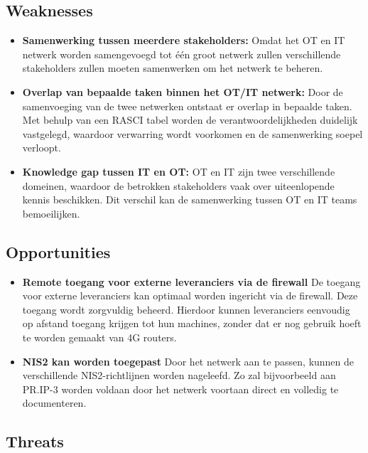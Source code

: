 \subsection{Weaknesses}

\begin{itemize}
    \item \textbf{Samenwerking tussen meerdere stakeholders:} Omdat het OT en IT netwerk worden samengevoegd tot één groot netwerk zullen verschillende stakeholders zullen moeten samenwerken om het netwerk te beheren. 
    
    \item \textbf{Overlap van bepaalde taken binnen het OT/IT netwerk:} Door de samenvoeging van de twee netwerken ontstaat er overlap in bepaalde taken. Met behulp van een RASCI tabel worden de verantwoordelijkheden duidelijk vastgelegd, waardoor verwarring wordt voorkomen en de samenwerking soepel verloopt.
    
    \item \textbf{Knowledge gap tussen IT en OT:} OT en IT zijn twee verschillende domeinen, waardoor de betrokken stakeholders vaak over uiteenlopende kennis beschikken. Dit verschil kan de samenwerking tussen OT en IT teams bemoeilijken.
    
\end{itemize}

\subsection{Opportunities}

\begin{itemize}
    \item \textbf{Remote toegang voor externe leveranciers via de firewall} De toegang voor externe leveranciers kan optimaal worden ingericht via de firewall. Deze toegang wordt zorgvuldig beheerd. Hierdoor kunnen leveranciers eenvoudig op afstand toegang krijgen tot hun machines, zonder dat er nog gebruik hoeft te worden gemaakt van 4G routers.
    
    \item \textbf{NIS2 kan worden toegepast} Door het netwerk aan te passen, kunnen de verschillende NIS2-richtlijnen worden nageleefd. Zo zal bijvoorbeeld aan PR.IP-3 worden voldaan door het netwerk voortaan direct en volledig te documenteren.
    
\end{itemize}


\subsection{Threats}

